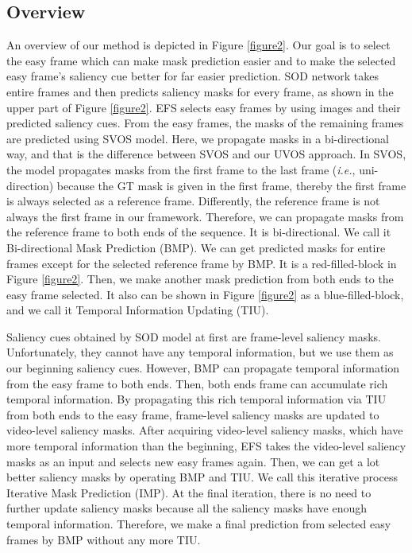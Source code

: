 \documentclass[letterpaper]{article} \usepackage{aaai22}  \usepackage{times}  \usepackage{helvet}  \usepackage{courier}  \usepackage[hyphens]{url}  \usepackage{graphicx} \urlstyle{rm} \def\UrlFont{\rm}  \usepackage{natbib}  \usepackage{caption} \DeclareCaptionStyle{ruled}{labelfont=normalfont,labelsep=colon,strut=off} \frenchspacing  \setlength{\pdfpagewidth}{8.5in}  \setlength{\pdfpageheight}{11in}  \usepackage{algorithm}
\begin{document}
\subsection{Overview}

An overview of our method is depicted in Figure \ref{figure2}. Our  goal is to select the easy frame which can make mask prediction easier and to make the selected easy frame’s saliency cue better for far easier prediction. 
SOD network takes entire frames and then predicts saliency masks for every frame, as shown in the upper part of Figure \ref{figure2}. EFS selects easy frames by using images and their predicted saliency cues.
From the easy frames, the masks of the remaining frames are predicted using SVOS model. Here, we propagate masks in a bi-directional way, and that is the difference between SVOS and our UVOS approach. In SVOS, the model propagates masks from the first frame to the last frame (\textit{i.e.}, uni-direction) because the GT mask is given in the first frame, thereby the first frame is always selected as a reference frame.
Differently, the reference frame is not always the first frame in our framework. Therefore, we can propagate masks from the reference frame to both ends of the sequence. It is bi-directional. 
We call it Bi-directional Mask Prediction (BMP). We can get predicted masks for entire frames except for the selected reference frame by BMP. It is a red-filled-block in Figure \ref{figure2}. Then, we make another mask prediction from both ends to the easy frame selected. It also can be shown in Figure \ref{figure2} as a blue-filled-block, and we call it Temporal Information Updating (TIU). 

Saliency cues obtained by SOD model at first are frame-level saliency masks. Unfortunately, they cannot have any temporal information, but we use them as our beginning saliency cues. However, BMP can propagate temporal information from the easy frame to both ends. Then, both ends frame can accumulate rich temporal information. By propagating this rich temporal information via TIU from both ends to the easy frame, frame-level saliency masks are updated to video-level saliency masks. After acquiring video-level saliency masks, which have more temporal information than the beginning, EFS takes the video-level saliency masks as an input and selects new easy frames again. Then, we can get a lot better saliency masks by operating BMP and TIU. We call this iterative process Iterative Mask Prediction (IMP). At the final iteration, there is no need to further update saliency masks because all the saliency masks have enough temporal information. Therefore, we make a final prediction from selected easy frames by BMP without any more TIU.
\end{document}
